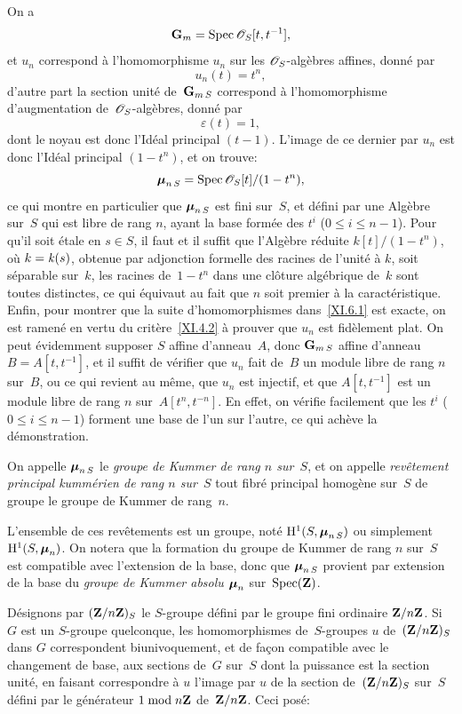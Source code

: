 On
a
$$
\GG_m=\Spec\cal{O}_S[t,t^{-1}],
$$
et $u_n$ correspond \`a l'homomorphisme $u_n$ sur les
$\cal{O}_S$-alg\`ebres affines, donn\'e par
$$
u_n(t)=t^n,
$$
d'autre part la section unit\'e de~$\mathbf{G}_{m\,S}$ correspond \`a
l'homomorphisme d'augmentation de~$\cal{O}_S$-alg\`ebres, donn\'e
par
$$
\varepsilon(t)=1,
$$
dont le noyau est donc l'Id\'eal principal $(t-1)$. L'image de ce
dernier par $u_n$ est donc l'Id\'eal principal $(1-t^n)$, et on
trouve:
$$
\bbmu_{n\,S}=\Spec\cal{O}_S[t]/(1-t^n),
$$
ce qui montre en particulier que $\boldsymbol{\mu}_{n\,S}$ est fini sur~$S$,
et d\'efini par une Alg\`ebre sur~$S$ qui est libre de rang $n$,
ayant la base form\'ee des $t^i$ ($0\leq i\leq n-1$). Pour qu'il soit
\'etale en $s\in S$, il faut et il suffit que l'Alg\`ebre
r\'eduite $k[t]/(1-t^n)$, o\`u $k=\mathit{k}(s)$, obtenue par adjonction
formelle des racines \niemes de l'unit\'e \`a $k$, soit
s\'eparable sur~$k$, \ie les racines de~$1-t^n$ dans une
cl\^oture alg\'ebrique de~$k$ sont toutes distinctes, ce qui
\'equivaut au fait que $n$ soit premier \`a la
caract\'eristique. Enfin, pour montrer que la suite
d'homomorphismes dans~\ref{XI.6.1} est exacte, on est ramen\'e en
vertu du crit\`ere~\ref{XI.4.2} \`a prouver que
$u_n$
est fid\`element plat. On peut \'evidemment supposer $S$ affine
d'anneau~$A$, donc $\mathbf{G}_{m\,S}$ affine d'anneau $B=A[t,t^{-1}]$, et il
suffit de v\'erifier que $u_n$ fait de~$B$ un module libre de rang
$n$ sur~$B$, ou ce qui revient au m\^eme, que $u_n$ est injectif, et
que $A[t,t^{-1}]$ est un module libre de rang $n$ sur~$A[t^n,t^{-n}]$. En effet, on v\'erifie facilement que les
$t^i$ ($0\leq i\leq n-1$) forment une base de l'un sur l'autre, ce qui
ach\`eve la d\'emonstration.

\begin{definition}
\label{XI.6.2}
On
appelle $\boldsymbol{\mu}_{n\,S}$ le \emph{groupe de Kummer de rang $n$
sur~$S$}, et on appelle \emph{revêtement principal kummérien
de rang
$n$ sur~$S$}
tout fibr\'e principal homog\`ene sur~$S$ de groupe le groupe de
Kummer de rang~$n$.
\end{definition}

L'ensemble de ces rev\^etements est un groupe, not\'e
$\mathrm{H}^1(S,\boldsymbol{\mu}_{n\,S})$ ou simplement $\mathrm{H}^1(S,\boldsymbol{\mu}_n)$. On
notera que la formation du groupe de Kummer de rang $n$ sur~$S$ est
compatible avec l'extension de la base, donc que $\boldsymbol{\mu}_{n\,S}$
provient par extension de la base du \emph{groupe de Kummer absolu
$\boldsymbol{\mu}_n$} sur~$\operatorname{Spec}(\mathbf{Z})$.

D\'esignons par $(\mathbf{Z}/n\mathbf{Z})_S$ le $S$-groupe d\'efini par le
groupe fini ordinaire $\mathbf{Z}/n\mathbf{Z}$. Si~$G$ est un $S$-groupe quelconque,
les homomorphismes de~$S$-groupes $u$ de~$(\mathbf{Z}/n\mathbf{Z})_S$ dans $G$
correspondent biunivoquement, et de fa\c con compatible avec le
changement de base, aux sections de~$G$ sur~$S$ dont la puissance
\nieme est la section unit\'e, en faisant correspondre \`a
$u$ l'image par $u$ de la section de~$(\mathbf{Z}/n\mathbf{Z})_S$ sur~$S$ d\'efini
par le g\'en\'erateur $1\bmod n\mathbf{Z}$ de~$\mathbf{Z}/n\mathbf{Z}$. Ceci pos\'e:

